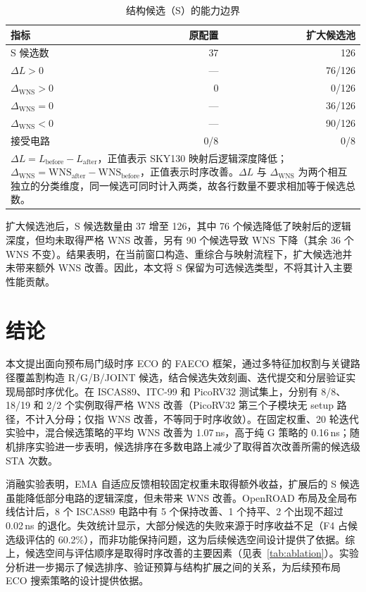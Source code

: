 \documentclass[twocolumn,10pt,fontset=windows]{ctexart}
\begin{document}
\begin{table}[H]
\centering
\caption{结构候选（S）的能力边界}
\label{tab:s_boundary}
\footnotesize
\setlength{\tabcolsep}{8pt}
\begin{tabular}{lrr}
\toprule
\textbf{指标} & \textbf{原配置} & \textbf{扩大候选池} \\
\midrule
S 候选数 & 37 & 126 \\
$\Delta L>0$ & — & 76/126 \\
$\Delta_{\mathrm{WNS}}>0$ & 0 & 0/126 \\
$\Delta_{\mathrm{WNS}}=0$ & — & 36/126 \\
$\Delta_{\mathrm{WNS}}<0$ & — & 90/126 \\
接受电路 & 0/8 & 0/8 \\
\bottomrule
\multicolumn{3}{p{0.9\columnwidth}}{\footnotesize $\Delta L=L_{\mathrm{before}}-L_{\mathrm{after}}$，正值表示 SKY130 映射后逻辑深度降低；$\Delta_{\mathrm{WNS}}=\mathrm{WNS}_{\mathrm{after}}-\mathrm{WNS}_{\mathrm{before}}$，正值表示时序改善。$\Delta L$ 与 $\Delta_{\mathrm{WNS}}$ 为两个相互独立的分类维度，同一候选可同时计入两类，故各行数量不要求相加等于候选总数。}\\
\end{tabular}
\end{table}

扩大候选池后，S 候选数量由 37 增至 126，其中 76 个候选降低了映射后的逻辑深度，但均未取得严格 WNS 改善，另有 90 个候选导致 WNS 下降（其余 36 个 WNS 不变）。结果表明，在当前窗口构造、重综合与映射流程下，扩大候选池并未带来额外 WNS 改善。因此，本文将 S 保留为可选候选类型，不将其计入主要性能贡献。

\section{结论}\label{sec:conclusion}

本文提出面向预布局门级时序 ECO 的 FAECO 框架，通过多特征加权割与关键路径覆盖割构造 R/G/B/JOINT 候选，结合候选失效刻画、迭代提交和分层验证实现局部时序优化。在 ISCAS89、ITC-99 和 PicoRV32 测试集上，分别有 8/8、18/19 和 2/2 个实例取得严格 WNS 改善（PicoRV32 第三个子模块无 setup 路径，不计入分母；仅指 WNS 改善，不等同于时序收敛）。在固定权重、20 轮迭代实验中，混合候选策略的平均 WNS 改善为 1.07\,ns，高于纯 G 策略的 0.16\,ns；随机排序实验进一步表明，候选排序在多数电路上减少了取得首次改善所需的候选级 STA 次数。

消融实验表明，EMA 自适应反馈相较固定权重未取得额外收益，扩展后的 S 候选虽能降低部分电路的逻辑深度，但未带来 WNS 改善。OpenROAD 布局及全局布线估计后，8 个 ISCAS89 电路中有 5 个保持改善、1 个持平、2 个出现不超过 0.02\,ns 的退化。失效统计显示，大部分候选的失败来源于时序收益不足（F4 占候选级评估的 60.2\%），而非功能保持问题，这为后续候选空间设计提供了依据。综上，候选空间与评估顺序是取得时序改善的主要因素（见表~\ref{tab:ablation}）。实验分析进一步揭示了候选排序、验证预算与结构扩展之间的关系，为后续预布局 ECO 搜索策略的设计提供依据。
\end{document}
